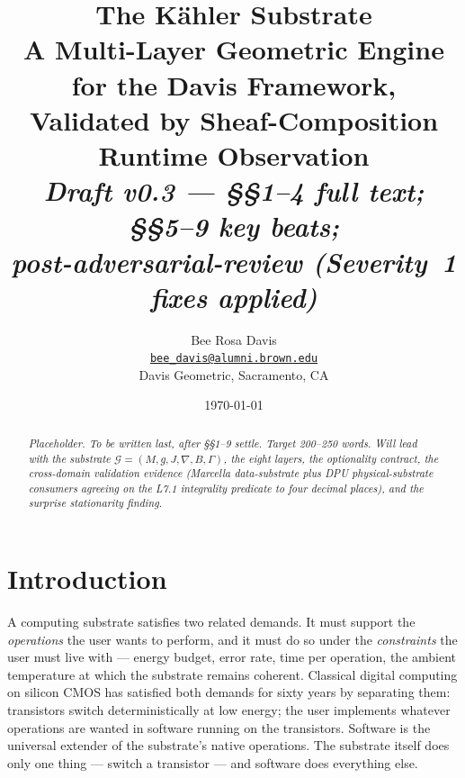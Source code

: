 \documentclass[11pt,letterpaper]{article}
\title{\textbf{The K\"ahler Substrate} \\[6pt]
\large A Multi-Layer Geometric Engine for the Davis Framework, \\
Validated by Sheaf-Composition Runtime Observation \\[10pt]
\normalsize \emph{Draft v0.3 --- \S\S1--4 full text; \S\S5--9 key beats; \\
post-adversarial-review (Severity~1 fixes applied)}}
\author{Bee Rosa Davis \\
\href{mailto:bee_davis@alumni.brown.edu}{\nolinkurl{bee_davis@alumni.brown.edu}} \\
Davis Geometric, Sacramento, CA}
\date{\today}
\begin{document}
\maketitle

\noindent{}

\bigskip

\begin{abstract}
\noindent\emph{Placeholder. To be written last, after \S\S1--9 settle.
Target 200--250 words. Will lead with the substrate
$\mathcal{G} = (M, g, J, \nabla, B, \Gamma)$, the eight layers, the
optionality contract, the cross-domain validation evidence (Marcella
data-substrate plus DPU physical-substrate consumers agreeing on the
L7.1 integrality predicate to four decimal places), and the surprise
stationarity finding.}
\end{abstract}

\tableofcontents
\bigskip


\section{Introduction}
\label{sec:intro}

A computing substrate satisfies two related demands. It must support
the \emph{operations} the user wants to perform, and it must do so
under the \emph{constraints} the user must live with --- energy
budget, error rate, time per operation, the ambient temperature at
which the substrate remains coherent. Classical digital computing on
silicon CMOS has satisfied both demands for sixty years by separating
them: transistors switch deterministically at low energy; the user
implements whatever operations are wanted in software running on the
transistors. Software is the universal extender of the substrate's
native operations. The substrate itself does only one thing --- switch
a transistor --- and software does everything else.
\end{document}
